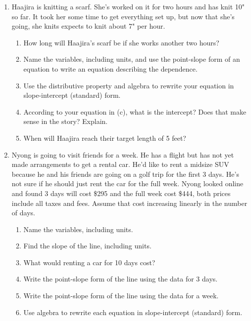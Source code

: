\begin{enumerate}
\begin{enumerate}
    \item Name the variables, including units.  Use STC as the units for how much noise is blocked.
    \item Assuming STC increases linearly, what is the slope?  
    \item Use the point-slope equation of a line to write an equation illustrating the dependence.
    \item Which piece of information did you use as your point?  Use the other point to check your equation.
\end{enumerate}


\item %
Haajira is knitting a scarf.  She's worked on it for two hours and has knit 10" so far.  It took her some time to get everything set up, but now that she's going, she knits expects to knit about 7" per hour.
\begin{enumerate}
    \item How long will Haajira's scarf be if she works another two hours?
    \item Name the variables, including units, and use the point-slope form of an equation to write an equation describing the dependence.
    \item Use the distributive property and algebra to rewrite your equation in slope-intercept (standard) form.  
    \item According to your equation in (c), what is the intercept?  Does that make sense in the story?  Explain.
    \item When will Haajira reach their target length of 5 feet?
\end{enumerate}

\item %
Nyong is going to visit friends for a week.  He has a flight but has not yet made arrangements to get a rental car. He'd like to rent a midsize SUV because he and his friends are going on a golf trip for the first 3 days.  He's not sure if he should just rent the car for the full week. Nyong looked online and found 3 days will cost \$295 and the full week cost \$444, both prices include all taxes and fees. Assume that cost increasing linearly in the number of days.
\begin{enumerate}
    \item Name the variables, including units.
    \item Find the slope of the line, including units.
    \item What would renting a car for 10 days cost?
    \item Write the point-slope form of the line using the data for 3 days.
    \item Write the point-slope form of the line using the data for a week.
    \item Use algebra to rewrite each equation in slope-intercept (standard) form.
\end{enumerate}


\end{enumerate}
